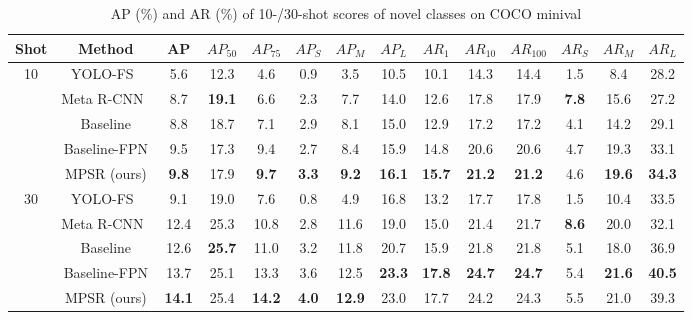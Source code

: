 \documentclass[runningheads]{llncs}
\begin{document}
\begin{table}
\begin{center}
\caption{AP (\%) and AR (\%) of 10-/30-shot scores of novel classes on COCO minival}
\label{table:cocotable}
\begin{tabular}{c|c|ccc|ccc|ccc|ccc}
	\hline
	Shot                & Method       & AP            & $AP_{50}$          & $AP_{75}$          & $AP_{S}$          & $AP_{M}$           & $AP_{L}$           & $AR_{1}$           & $AR_{10}$          & $AR_{100}$         & $AR_{S}$          & $AR_{M}$           & $AR_{L}$           \\ \hline
	\multirow{5}{*}{10} & YOLO-FS~\cite{yolore}      & 5.6           & 12.3          & 4.6           & 0.9          & 3.5           & 10.5          & 10.1          & 14.3          & 14.4          & 1.5          & 8.4           & 28.2          \\
	& Meta R-CNN~\cite{metarcnn}   & 8.7           & \textbf{19.1} & 6.6           & 2.3          & 7.7           & 14.0          & 12.6          & 17.8          & 17.9          & \textbf{7.8} & 15.6          & 27.2          \\
	& Baseline     & 8.8           & 18.7          & 7.1           & 2.9          & 8.1           & 15.0          & 12.9          & 17.2          & 17.2          & 4.1          & 14.2          & 29.1          \\
	& Baseline-FPN & 9.5           & 17.3          & 9.4           & 2.7          & 8.4           & 15.9          & 14.8          & 20.6          & 20.6          & 4.7          & 19.3          & 33.1          \\
	& MPSR (ours)  & \textbf{9.8}  & 17.9          & \textbf{9.7}  & \textbf{3.3} & \textbf{9.2}  & \textbf{16.1} & \textbf{15.7} & \textbf{21.2} & \textbf{21.2} & 4.6          & \textbf{19.6} & \textbf{34.3} \\ \hline
	\multirow{5}{*}{30} & YOLO-FS~\cite{yolore}      & 9.1           & 19.0          & 7.6           & 0.8          & 4.9           & 16.8          & 13.2          & 17.7          & 17.8          & 1.5          & 10.4          & 33.5          \\
	& Meta R-CNN~\cite{metarcnn}   & 12.4          & 25.3          & 10.8          & 2.8          & 11.6          & 19.0          & 15.0          & 21.4          & 21.7          & \textbf{8.6} & 20.0          & 32.1          \\
	& Baseline     & 12.6          & \textbf{25.7} & 11.0          & 3.2          & 11.8          & 20.7          & 15.9          & 21.8          & 21.8          & 5.1          & 18.0          & 36.9          \\
	& Baseline-FPN & 13.7          & 25.1          & 13.3          & 3.6          & 12.5          & \textbf{23.3} & \textbf{17.8} & \textbf{24.7} & \textbf{24.7} & 5.4          & \textbf{21.6} & \textbf{40.5} \\
	& MPSR (ours)  & \textbf{14.1} & 25.4          & \textbf{14.2} & \textbf{4.0} & \textbf{12.9} & 23.0          & 17.7          & 24.2          & 24.3          & 5.5          & 21.0          & 39.3          \\ \hline
\end{tabular}
\end{center}
\end{table}
\end{document}
